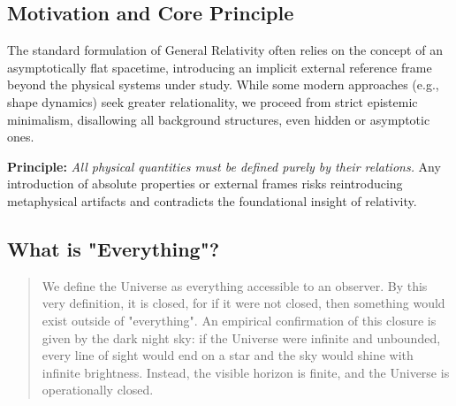 \documentclass[12pt, a4paper]{article}
\begin{document}
\subsection{Motivation and Core Principle}

The standard formulation of General Relativity often relies on the concept of an asymptotically flat spacetime, introducing an implicit external reference frame beyond the physical systems under study. 
While some modern approaches (e.g., shape dynamics) seek greater relationality, we proceed from strict epistemic minimalism, disallowing all background structures, even hidden or asymptotic ones. 

\textbf{Principle:} \emph{All physical quantities must be defined purely by their relations.} 
Any introduction of absolute properties or external frames risks reintroducing metaphysical artifacts and contradicts the foundational insight of relativity.

\subsection{What is "Everything"?}
\begin{quote}
We define the Universe as everything accessible to an observer.  
By this very definition, it is closed, for if it were not closed, then something would exist outside of "everything".  
An empirical confirmation of this closure is given by the dark night sky: if the Universe were infinite and unbounded, every line of sight would end on a star and the sky would shine with infinite brightness.  
Instead, the visible horizon is finite, and the Universe is operationally closed.  
\end{quote}
\end{document}
